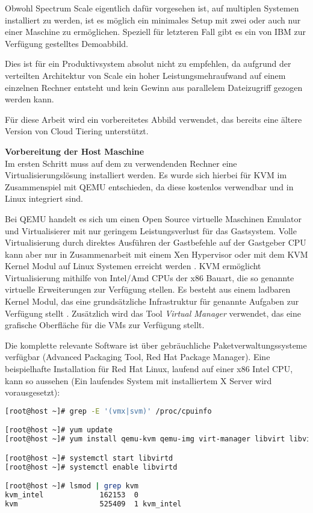 Obwohl Spectrum Scale eigentlich dafür vorgesehen ist, auf multiplen Systemen installiert zu werden, ist es möglich ein minimales Setup mit zwei oder auch nur einer Maschine zu ermöglichen. Speziell für letzteren Fall gibt es ein von IBM zur Verfügung gestelltes Demoabbild.

Dies ist für ein Produktivsystem absolut nicht zu empfehlen, da aufgrund der verteilten Architektur von Scale ein hoher Leistungsmehraufwand auf einem einzelnen Rechner entsteht und kein Gewinn aus parallelem Dateizugriff gezogen werden kann.

Für diese Arbeit wird ein vorbereitetes Abbild verwendet, das bereits eine ältere Version von Cloud Tiering unterstützt.

\textbf{Vorbereitung der Host Maschine}\\
Im ersten Schritt muss auf dem zu verwendenden Rechner eine Virtualisierungslösung installiert werden. Es wurde sich hierbei für \ac{KVM} im Zusammenspiel mit \ac{QEMU} entschieden, da diese kostenlos verwendbar und in Linux integriert sind. 

Bei QEMU handelt es sich um einen Open Source virtuelle Maschinen Emulator und Virtualisierer mit nur geringem Leistungsverlust für das Gastsystem. Volle Virtualisierung durch direktes Ausführen der Gastbefehle auf der Gastgeber CPU kann aber nur in Zusammenarbeit mit einem Xen Hypervisor oder mit dem KVM Kernel Modul auf Linux Systemen erreicht werden \parencite{qemu.2017}. 
KVM ermöglicht Virtualisierung mithilfe von Intel/Amd CPUs der x86 Bauart, die so genannte virtuelle Erweiterungen zur Verfügung stellen. Es besteht aus einem ladbaren Kernel Modul, das eine grundsätzliche Infrastruktur für genannte Aufgaben zur Verfügung stellt \parencite{kvm.2017}.
Zusätzlich wird das Tool \textit{Virtual Manager} verwendet, das eine grafische Oberfläche für die \acs{VM}s zur Verfügung stellt.

Die komplette relevante Software ist über gebräuchliche Paketverwaltungssysteme verfügbar (Advanced Packaging Tool, Red Hat Package Manager). Eine beispielhafte Installation für Red Hat Linux, laufend auf einer x86 Intel CPU, kann so aussehen (Ein laufendes System mit installiertem X Server wird vorausgesetzt):\\ 

\begin{lstlisting}[language=bash, caption=Einrichtung von KVM und QEMU]
[root@host ~]# grep -E '(vmx|svm)' /proc/cpuinfo 

[root@host ~]# yum update
[root@host ~]# yum install qemu-kvm qemu-img virt-manager libvirt libvirt-python libvirt-client virt-install virt-viewer bridge-utils

[root@host ~]# systemctl start libvirtd
[root@host ~]# systemctl enable libvirtd

[root@host ~]# lsmod | grep kvm
kvm_intel             162153  0
kvm                   525409  1 kvm_intel
\end{lstlisting} 

